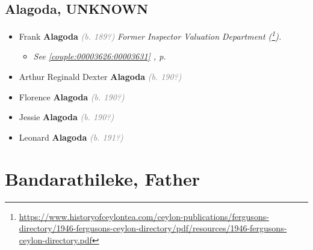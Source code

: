 \documentclass[10pt, openany]{book}
\begin{document}
\chapter{Alagoda, UNKNOWN}
\label{00003677}
\textcolor{slmaroon}{\textit{}}
\begin{itemize}
\item{Frank \textbf{Alagoda} \textcolor{gray}{\textit{(b. 189?)}} \textcolor{slmaroon}{\textit{Former Inspector Valuation Department (\footnote{\url{https://www.historyofceylontea.com/ceylon-publications/fergusons-directory/1946-fergusons-ceylon-directory/pdf/resources/1946-fergusons-ceylon-directory.pdf}}).}}
\begin{itemize}
\item{\textcolor{slteal}{\textit{See  \autoref{couple:00003626:00003631} \textit{, p. \pageref{couple:00003626:00003631} }}}}
\end{itemize}
 }
\item{Arthur Reginald Dexter \textbf{Alagoda} \textcolor{gray}{\textit{(b. 190?)}}
   }
\item{Florence \textbf{Alagoda} \textcolor{gray}{\textit{(b. 190?)}}
 }
\item{Jessie \textbf{Alagoda} \textcolor{gray}{\textit{(b. 190?)}}
 }
\item{Leonard \textbf{Alagoda} \textcolor{gray}{\textit{(b. 191?)}}
 }
\end{itemize}
 
\part{Bandarathileke, Father}
\end{document}
